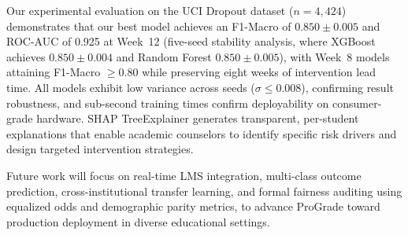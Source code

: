 \documentclass[conference,a4paper]{IEEEtran}
\begin{document}
Our experimental evaluation on the UCI Dropout dataset ($n = 4{,}424$) demonstrates that our best model achieves an F1-Macro of $0.850 \pm 0.005$ and ROC-AUC of 0.925 at Week~12 (five-seed stability analysis, where XGBoost achieves $0.850 \pm 0.004$ and Random Forest $0.850 \pm 0.005$), with Week~8 models attaining F1-Macro $\geq 0.80$ while preserving eight weeks of intervention lead time. All models exhibit low variance across seeds ($\sigma \leq 0.008$), confirming result robustness, and sub-second training times confirm deployability on consumer-grade hardware. SHAP TreeExplainer generates transparent, per-student explanations that enable academic counselors to identify specific risk drivers and design targeted intervention strategies.

Future work will focus on real-time LMS integration, multi-class outcome prediction, cross-institutional transfer learning, and formal fairness auditing using equalized odds and demographic parity metrics, to advance ProGrade toward production deployment in diverse educational settings.



\end{document}
